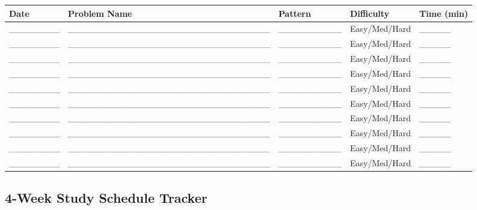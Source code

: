 \documentclass[10pt,a4paper]{article}
\begin{document}
\begin{table}[h]
\centering
\begin{tabular}{|p{3cm}|p{5cm}|p{2cm}|p{2cm}|p{2cm}|}
\hline
\textbf{Date} & \textbf{Problem Name} & \textbf{Pattern} & \textbf{Difficulty} & \textbf{Time (min)} \\
\hline
\_\_\_\_\_\_\_\_ & \_\_\_\_\_\_\_\_\_\_\_\_\_\_\_\_\_\_\_\_\_\_\_\_\_\_\_\_\_\_\_\_ & \_\_\_\_\_\_\_\_\_\_ & Easy/Med/Hard & \_\_\_\_\_ \\
\hline
\_\_\_\_\_\_\_\_ & \_\_\_\_\_\_\_\_\_\_\_\_\_\_\_\_\_\_\_\_\_\_\_\_\_\_\_\_\_\_\_\_ & \_\_\_\_\_\_\_\_\_\_ & Easy/Med/Hard & \_\_\_\_\_ \\
\hline
\_\_\_\_\_\_\_\_ & \_\_\_\_\_\_\_\_\_\_\_\_\_\_\_\_\_\_\_\_\_\_\_\_\_\_\_\_\_\_\_\_ & \_\_\_\_\_\_\_\_\_\_ & Easy/Med/Hard & \_\_\_\_\_ \\
\hline
\_\_\_\_\_\_\_\_ & \_\_\_\_\_\_\_\_\_\_\_\_\_\_\_\_\_\_\_\_\_\_\_\_\_\_\_\_\_\_\_\_ & \_\_\_\_\_\_\_\_\_\_ & Easy/Med/Hard & \_\_\_\_\_ \\
\hline
\_\_\_\_\_\_\_\_ & \_\_\_\_\_\_\_\_\_\_\_\_\_\_\_\_\_\_\_\_\_\_\_\_\_\_\_\_\_\_\_\_ & \_\_\_\_\_\_\_\_\_\_ & Easy/Med/Hard & \_\_\_\_\_ \\
\hline
\_\_\_\_\_\_\_\_ & \_\_\_\_\_\_\_\_\_\_\_\_\_\_\_\_\_\_\_\_\_\_\_\_\_\_\_\_\_\_\_\_ & \_\_\_\_\_\_\_\_\_\_ & Easy/Med/Hard & \_\_\_\_\_ \\
\hline
\_\_\_\_\_\_\_\_ & \_\_\_\_\_\_\_\_\_\_\_\_\_\_\_\_\_\_\_\_\_\_\_\_\_\_\_\_\_\_\_\_ & \_\_\_\_\_\_\_\_\_\_ & Easy/Med/Hard & \_\_\_\_\_ \\
\hline
\_\_\_\_\_\_\_\_ & \_\_\_\_\_\_\_\_\_\_\_\_\_\_\_\_\_\_\_\_\_\_\_\_\_\_\_\_\_\_\_\_ & \_\_\_\_\_\_\_\_\_\_ & Easy/Med/Hard & \_\_\_\_\_ \\
\hline
\_\_\_\_\_\_\_\_ & \_\_\_\_\_\_\_\_\_\_\_\_\_\_\_\_\_\_\_\_\_\_\_\_\_\_\_\_\_\_\_\_ & \_\_\_\_\_\_\_\_\_\_ & Easy/Med/Hard & \_\_\_\_\_ \\
\hline
\_\_\_\_\_\_\_\_ & \_\_\_\_\_\_\_\_\_\_\_\_\_\_\_\_\_\_\_\_\_\_\_\_\_\_\_\_\_\_\_\_ & \_\_\_\_\_\_\_\_\_\_ & Easy/Med/Hard & \_\_\_\_\_ \\
\hline
\end{tabular}
\end{table}

\newpage

\subsection{4-Week Study Schedule Tracker}
\end{document}
